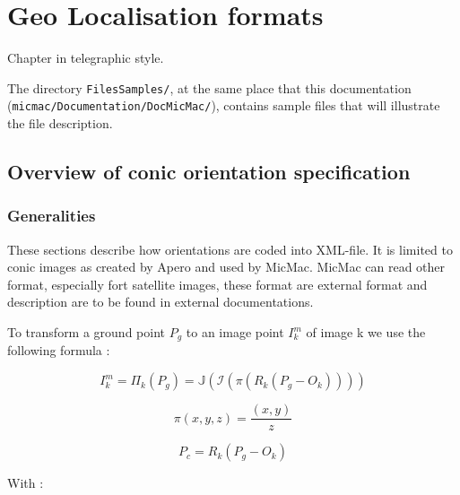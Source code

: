 \chapter{Geo Localisation formats}

\label{Chap:GeoLoc}


Chapter in telegraphic style.

The directory {\tt FilesSamples/}, at the same place that this documentation
({\tt micmac/Documentation/DocMicMac/}), contains sample files that will illustrate
the file description.


\section{Overview of conic orientation specification}


\subsection{Generalities}

These sections describe how orientations are coded into XML-file. It is limited
to conic images as created by Apero and used by MicMac.   MicMac can read
other format, especially fort satellite images, these format are external format
and description are to be found in external documentations.


To transform a ground point $P_g$   to an image point $I^m_k$ of image k we use the following formula :

\begin{equation}
    I^m_k =  \Pi_k(P_g) =  \mathbb{J}(   \mathcal{I} (\pi (R_k (P_g -O_k))))
\end{equation}

\begin{equation}
    \pi(x,y,z) =  \frac{(x,y)}{z} \label{Proj:Stenope}
\end{equation}

\begin{equation}
    P_c = R_k (P_g -O_k)
\end{equation}

With :

